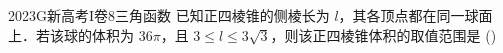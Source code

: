 
\begin{problem}{2023}{G}{新高考I卷}{8}{三角函数}
已知正四棱锥的侧棱长为 $ l $，其各顶点都在同一球面上．若该球的体积为 $ 36\pi $，且 $ 3\leqslant l\leqslant 3\sqrt{3} $，则该正四棱锥体积的取值范围是 (\hspace{1cm})
\begin{choices}
\choice{{${\left[18,27\right]}$}}
\end{choices}
\end{problem}

\begin{answer}

\end{answer}

\begin{solutions}

\end{solutions}